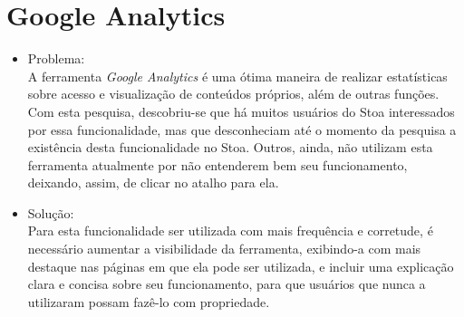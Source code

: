\section{Google Analytics}
    \begin{itemize}
    \item Problema:\\
    A ferramenta \emph{Google Analytics} é uma ótima maneira de realizar estatísticas sobre acesso e visualização de conteúdos próprios, além de outras funções. Com esta pesquisa, descobriu-se que há muitos usuários do Stoa interessados por essa funcionalidade, mas que desconheciam até o momento da pesquisa a existência desta funcionalidade no Stoa. Outros, ainda, não utilizam esta ferramenta atualmente por não entenderem bem seu funcionamento, deixando, assim, de clicar no atalho para ela.

    \item Solução:\\
    Para esta funcionalidade ser utilizada com mais frequência e corretude, é necessário aumentar a visibilidade da ferramenta, exibindo-a com mais destaque nas páginas em que ela pode ser utilizada, e incluir uma explicação clara e concisa sobre seu funcionamento, para que usuários que nunca a  utilizaram possam fazê-lo com propriedade.
    \end{itemize}







